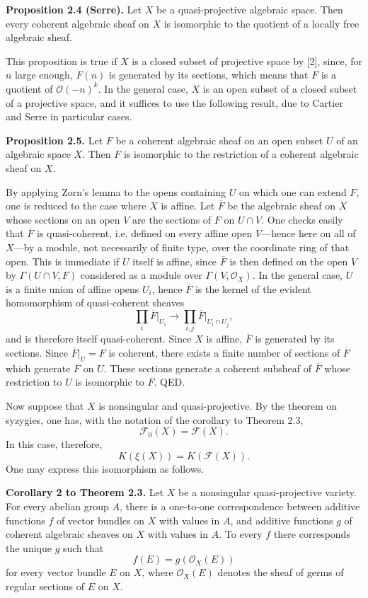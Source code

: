 \documentclass[11pt]{article}
\providecommand{\cF}{\mathscr F}
\providecommand{\cO}{\mathcal O}
\begin{document}
\textbf{Proposition 2.4 (Serre).} Let $X$ be a quasi-projective algebraic space. Then every coherent algebraic sheaf on $X$ is isomorphic to the quotient of a locally free algebraic sheaf.

This proposition is true if $X$ is a closed subset of projective space by [2], since, for $n$ large enough, $F(n)$ is generated by its sections, which means that $F$ is a quotient of $\cO(-n)^k$. In the general case, $X$ is an open subset of a closed subset of a projective space, and it suffices to use the following result, due to Cartier and Serre in particular cases.

\textbf{Proposition 2.5.} Let $F$ be a coherent algebraic sheaf on an open subset $U$ of an algebraic space $X$. Then $F$ is isomorphic to the restriction of a coherent algebraic sheaf on $X$.

By applying Zorn's lemma to the opens containing $U$ on which one can extend $F$, one is reduced to the case where $X$ is affine. Let $\overline F$ be the algebraic sheaf on $X$ whose sections on an open $V$ are the sections of $F$ on $U\cap V$. One checks easily that $\overline F$ is quasi-coherent, i.e. defined on every affine open $V$---hence here on all of $X$---by a module, not necessarily of finite type, over the coordinate ring of that open. This is immediate if $U$ itself is affine, since $\overline F$ is then defined on the open $V$ by $\Gamma(U\cap V,F)$ considered as a module over $\Gamma(V,\cO_X)$. In the general case, $U$ is a finite union of affine opens $U_i$, hence $\overline F$ is the kernel of the evident homomorphism of quasi-coherent sheaves
\[
 \prod_i \overline F\big|_{U_i}\longrightarrow \prod_{i,j}\overline F\big|_{U_i\cap U_j},
\]
and is therefore itself quasi-coherent. Since $X$ is affine, $\overline F$ is generated by its sections. Since $\overline F|_U=F$ is coherent, there exists a finite number of sections of $\overline F$ which generate $F$ on $U$. These sections generate a coherent subsheaf of $\overline F$ whose restriction to $U$ is isomorphic to $F$. QED.

Now suppose that $X$ is nonsingular and quasi-projective. By the theorem on syzygies, one has, with the notation of the corollary to Theorem 2.3,
\[
 \cF_0(X)=\cF(X).
\]
In this case, therefore,
\begin{equation}\tag{2.13}
 K(\xi(X))=K(\cF(X)).
\end{equation}
One may express this isomorphism as follows.

\textbf{Corollary 2 to Theorem 2.3.} Let $X$ be a nonsingular quasi-projective variety. For every abelian group $A$, there is a one-to-one correspondence between additive functions $f$ of vector bundles on $X$ with values in $A$, and additive functions $g$ of coherent algebraic sheaves on $X$ with values in $A$. To every $f$ there corresponds the unique $g$ such that
\begin{equation}\tag{2.14}
 f(E)=g(\cO_X(E))
\end{equation}
for every vector bundle $E$ on $X$, where $\cO_X(E)$ denotes the sheaf of germs of regular sections of $E$ on $X$.
\end{document}
